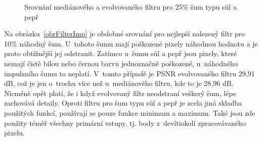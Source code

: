 \begin{figure}[hbt]
    \centering
    \hfill
    \hfill
    \caption{Srovnání mediánového a evolvovaného filtru pro 25\% šum typu sůl a pepř}
    \label{obrFilterSP}
\end{figure}

Na obrázku~\ref{obrFilterImp} je obdobné srovnání pro nejlepší nalezený filtr pro 10\% náhodný šum. U~tohoto šumu mají poškozené pixely náhodnou hodnotu a je proto obtížnější jej odstranit. Zatímco u~šumu sůl a pepř jsou pixely, které nemají čistě bílou nebo černou barvu jednoznačně poškozené, u~náhodného impulzního šumu to neplatí. V~tomto případě je PSNR evolvovaného filtru 29,91 dB, což je jen o~trochu více než u~mediánového filtru, kde to je 28,96 dB. Nicméně opět platí, že i když evolvovaný filtr neodstraní veškerý šum, lépe zachovává detaily. Oproti filtru pro šum typu sůl a pepř je zcela jiná skladba použitých funkcí, používají se pouze funkce minimum a maximum. Také jsou zde použity téměř všechny primární vstupy, tj. body z~devítiokolí zpracovávaného pixelu.

